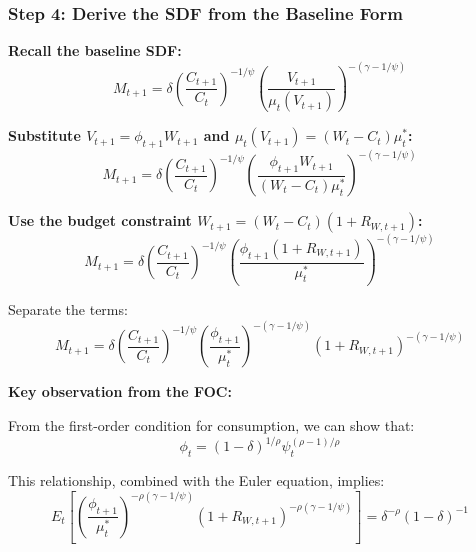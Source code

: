\documentclass{beamer}
\begin{document}
\begin{frame}[allowframebreaks]
    \frametitle{Step 4: Derive the SDF from the Baseline Form}
    
    \textbf{Recall the baseline SDF:}
    \begin{equation*}
        M_{t+1} = \delta \left( \frac{C_{t+1}}{C_t} \right)^{-1/\psi} \left( \frac{V_{t+1}}{\mu_t(V_{t+1})} \right)^{-(\gamma-1/\psi)}
    \end{equation*}
    
    \textbf{Substitute $V_{t+1} = \phi_{t+1} W_{t+1}$ and $\mu_t(V_{t+1}) = (W_t - C_t)\mu_t^*$:}
    \begin{equation*}
        M_{t+1} = \delta \left( \frac{C_{t+1}}{C_t} \right)^{-1/\psi} \left( \frac{\phi_{t+1} W_{t+1}}{(W_t - C_t)\mu_t^*} \right)^{-(\gamma-1/\psi)}
    \end{equation*}
    
    \framebreak
    
    \textbf{Use the budget constraint $W_{t+1} = (W_t - C_t)(1 + R_{W,t+1})$:}
    \begin{equation*}
        M_{t+1} = \delta \left( \frac{C_{t+1}}{C_t} \right)^{-1/\psi} \left( \frac{\phi_{t+1} (1 + R_{W,t+1})}{\mu_t^*} \right)^{-(\gamma-1/\psi)}
    \end{equation*}
    
    Separate the terms:
    \begin{equation*}
        M_{t+1} = \delta \left( \frac{C_{t+1}}{C_t} \right)^{-1/\psi} \left(\frac{\phi_{t+1}}{\mu_t^*}\right)^{-(\gamma-1/\psi)} (1 + R_{W,t+1})^{-(\gamma-1/\psi)}
    \end{equation*}
    
    \framebreak
    
    \textbf{Key observation from the FOC:}
    
    From the first-order condition for consumption, we can show that:
    \begin{equation*}
        \phi_t = (1-\delta)^{1/\rho} \psi_t^{(\rho-1)/\rho}
    \end{equation*}
    
    This relationship, combined with the Euler equation, implies:
    \begin{equation*}
        E_t\left[\left(\frac{\phi_{t+1}}{\mu_t^*}\right)^{-\rho(\gamma-1/\psi)} (1 + R_{W,t+1})^{-\rho(\gamma-1/\psi)}\right] = \delta^{-\rho}(1-\delta)^{-1}
    \end{equation*}
    
    \framebreak
    

\end{frame}
\end{document}
